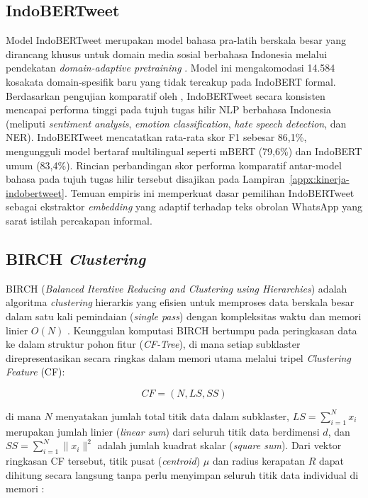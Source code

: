 \subsection{IndoBERTweet}
\label{subsec:indobertweet}

Model IndoBERTweet merupakan model bahasa pra-latih berskala besar yang dirancang khusus untuk domain media sosial berbahasa Indonesia melalui pendekatan \textit{domain-adaptive pretraining} \citep{koto2021indobertweet}. Model ini mengakomodasi 14.584 kosakata domain-spesifik baru yang tidak tercakup pada IndoBERT formal.
Berdasarkan pengujian komparatif oleh \citet{koto2021indobertweet}, IndoBERTweet secara konsisten mencapai performa tinggi pada tujuh tugas hilir NLP berbahasa Indonesia (meliputi \textit{sentiment analysis}, \textit{emotion classification}, \textit{hate speech detection}, dan NER). IndoBERTweet mencatatkan rata-rata skor F1 sebesar 86{,}1\%, mengungguli model bertaraf multilingual seperti mBERT (79{,}6\%) dan IndoBERT umum (83{,}4\%). Rincian perbandingan skor performa komparatif antar-model bahasa pada tujuh tugas hilir tersebut disajikan pada Lampiran~\ref{appx:kinerja-indobertweet}. Temuan empiris ini memperkuat dasar pemilihan IndoBERTweet sebagai ekstraktor \textit{embedding} yang adaptif terhadap teks obrolan WhatsApp yang sarat istilah percakapan informal.

\subsection{BIRCH \textit{Clustering}}
\label{subsec:birch}

BIRCH (\textit{Balanced Iterative Reducing and Clustering using Hierarchies}) adalah algoritma \textit{clustering} hierarkis yang efisien untuk memproses data berskala besar dalam satu kali pemindaian (\textit{single pass}) dengan kompleksitas waktu dan memori linier $O(N)$ \citep{10.1145/235968.233324,10.1023/A:1009783824328}. Keunggulan komputasi BIRCH bertumpu pada peringkasan data ke dalam struktur pohon fitur (\textit{CF-Tree}), di mana setiap subklaster direpresentasikan secara ringkas dalam memori utama melalui tripel \textit{Clustering Feature} (CF):

\begin{equation}
	CF = (N, LS, SS)
\end{equation}

\noindent di mana $N$ menyatakan jumlah total titik data dalam subklaster, $LS = \sum_{i=1}^{N} x_i$ merupakan jumlah linier (\textit{linear sum}) dari seluruh titik data berdimensi $d$, dan $SS = \sum_{i=1}^{N} \lVert x_i \rVert^2$ adalah jumlah kuadrat skalar (\textit{square sum}). Dari vektor ringkasan CF tersebut, titik pusat (\textit{centroid}) $\mu$ dan radius kerapatan $R$ dapat dihitung secara langsung tanpa perlu menyimpan seluruh titik data individual di memori \citep{IJECE25896}:

